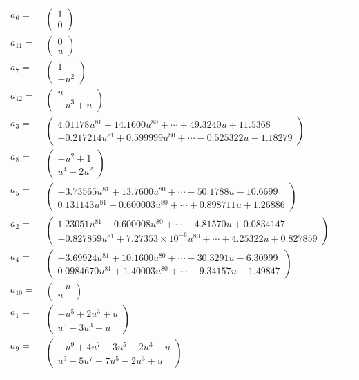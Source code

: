 \documentclass[1p]{elsarticle_modified}
\theoremstyle{definition}
\begin{document}
\begin{tabular}{m{7pt} m{180pt} m{7pt} m{180pt} }
\flushright $a_{6}=$&$\begin{pmatrix}1\\0\end{pmatrix}$ \\
\flushright $a_{11}=$&$\begin{pmatrix}0\\u\end{pmatrix}$ \\
\flushright $a_{7}=$&$\begin{pmatrix}1\\- u^2\end{pmatrix}$ \\
\flushright $a_{12}=$&$\begin{pmatrix}u\\- u^3+u\end{pmatrix}$ \\
\flushright $a_{3}=$&$\begin{pmatrix}4.01178 u^{81}-14.1600 u^{80}+\cdots+49.3240 u+11.5368\\-0.217214 u^{81}+0.599999 u^{80}+\cdots-0.525322 u-1.18279\end{pmatrix}$ \\
\flushright $a_{8}=$&$\begin{pmatrix}- u^2+1\\u^4-2 u^2\end{pmatrix}$ \\
\flushright $a_{5}=$&$\begin{pmatrix}-3.73565 u^{81}+13.7600 u^{80}+\cdots-50.1788 u-10.6699\\0.131143 u^{81}-0.600003 u^{80}+\cdots+0.898711 u+1.26886\end{pmatrix}$ \\
\flushright $a_{2}=$&$\begin{pmatrix}1.23051 u^{81}-0.600008 u^{80}+\cdots-4.81570 u+0.0834147\\-0.827859 u^{81}+7.27353\times10^{-6} u^{80}+\cdots+4.25322 u+0.827859\end{pmatrix}$ \\
\flushright $a_{4}=$&$\begin{pmatrix}-3.69924 u^{81}+10.1600 u^{80}+\cdots-30.3291 u-6.30999\\0.0984670 u^{81}+1.40003 u^{80}+\cdots-9.34157 u-1.49847\end{pmatrix}$ \\
\flushright $a_{10}=$&$\begin{pmatrix}- u\\u\end{pmatrix}$ \\
\flushright $a_{1}=$&$\begin{pmatrix}- u^5+2 u^3+u\\u^5-3 u^3+u\end{pmatrix}$ \\
\flushright $a_{9}=$&$\begin{pmatrix}- u^9+4 u^7-3 u^5-2 u^3- u\\u^9-5 u^7+7 u^5-2 u^3+u\end{pmatrix}$\\&\end{tabular}
\end{document}
